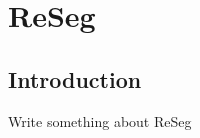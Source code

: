 \chapter{ReSeg}\label{sec:reseg}

\section{Introduction}\label{sec:i}
Write something about ReSeg


